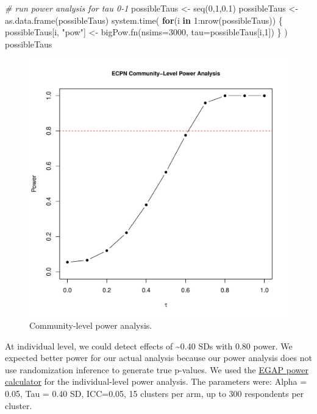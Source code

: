 \documentclass[
]{article}
\newenvironment{Shaded}{\begin{snugshade}}{\end{snugshade}}
\newcommand{\AttributeTok}[1]{\textcolor[rgb]{0.77,0.63,0.00}{#1}}
\newcommand{\CommentTok}[1]{\textcolor[rgb]{0.56,0.35,0.01}{\textit{#1}}}
\newcommand{\ControlFlowTok}[1]{\textcolor[rgb]{0.13,0.29,0.53}{\textbf{#1}}}
\newcommand{\DecValTok}[1]{\textcolor[rgb]{0.00,0.00,0.81}{#1}}
\newcommand{\FloatTok}[1]{\textcolor[rgb]{0.00,0.00,0.81}{#1}}
\newcommand{\FunctionTok}[1]{\textcolor[rgb]{0.00,0.00,0.00}{#1}}
\newcommand{\NormalTok}[1]{#1}
\newcommand{\OtherTok}[1]{\textcolor[rgb]{0.56,0.35,0.01}{#1}}
\newcommand{\SpecialCharTok}[1]{\textcolor[rgb]{0.00,0.00,0.00}{#1}}
\newcommand{\StringTok}[1]{\textcolor[rgb]{0.31,0.60,0.02}{#1}}
\begin{document}
\begin{Shaded}
\begin{Highlighting}[]
\CommentTok{\# run power analysis for tau 0{-}1}
\NormalTok{possibleTaus }\OtherTok{\textless{}{-}} \FunctionTok{seq}\NormalTok{(}\DecValTok{0}\NormalTok{,}\DecValTok{1}\NormalTok{,}\FloatTok{0.1}\NormalTok{)}
\NormalTok{possibleTaus }\OtherTok{\textless{}{-}} \FunctionTok{as.data.frame}\NormalTok{(possibleTaus)}
\FunctionTok{system.time}\NormalTok{(}
\ControlFlowTok{for}\NormalTok{(i }\ControlFlowTok{in} \DecValTok{1}\SpecialCharTok{:}\FunctionTok{nrow}\NormalTok{(possibleTaus))}
\NormalTok{\{}
\NormalTok{  possibleTaus[i, }\StringTok{"pow"}\NormalTok{] }\OtherTok{\textless{}{-}} \FunctionTok{bigPow.fn}\NormalTok{(}\AttributeTok{nsims=}\DecValTok{3000}\NormalTok{, }\AttributeTok{tau=}\NormalTok{possibleTaus[i,}\DecValTok{1}\NormalTok{])}
\NormalTok{\}}
\NormalTok{)}
\NormalTok{possibleTaus}
\end{Highlighting}
\end{Shaded}

\begin{figure}[H]
\centering
\includegraphics[width=\linewidth]{../data_and_code/review/power_figure.pdf}
\caption{Community-level power analysis.}\label{fig:pow_comm}
\end{figure}

At individual level, we could detect effects of \textasciitilde0.40 SDs
with 0.80 power. We expected better power for our actual analysis
because our power analysis does not use randomization inference to
generate true p-values. We used the
\href{https://egap.shinyapps.io/power-app/}{EGAP power calculator} for
the individual-level power analysis. The parameters were: Alpha = 0.05,
Tau = 0.40 SD, ICC=0.05, 15 clusters per arm, up to 300 respondents per
cluster.
\end{document}
